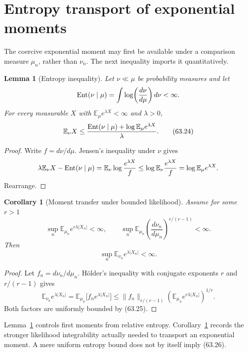 \documentclass[11pt]{article}
\newtheorem{lemma}[theorem]{Lemma}
\newtheorem{corollary}[theorem]{Corollary}
\theoremstyle{remark}
\begin{document}
\section{Entropy transport of exponential moments}

The coercive exponential moment may first be available under a
comparison measure \(\mu_n\), rather than \(\nu_n\).  The next
inequality imports it quantitatively.

\begin{lemma}[Entropy inequality]
\label{lem:v15v63-entropy}
Let \(\nu\ll\mu\) be probability measures and let
\[
 {\rm Ent}(\nu\mid\mu)
 =
 \int\log\!\left(\frac{d\nu}{d\mu}\right)d\nu<\infty.
\]
For every measurable \(X\) with
\(\mathbb E_\mu e^{\lambda X}<\infty\) and \(\lambda>0\),
\[
 \mathbb E_\nu X
 \leq
 \frac{
 {\rm Ent}(\nu\mid\mu)+
 \log\mathbb E_\mu e^{\lambda X}}
 {\lambda}.                                           \tag{63.24}
\]
\end{lemma}

\begin{proof}
Write \(f=d\nu/d\mu\).  Jensen's inequality under \(\nu\) gives
\[
 \lambda\mathbb E_\nu X-{\rm Ent}(\nu\mid\mu)
 =
 \mathbb E_\nu\log\frac{e^{\lambda X}}{f}
 \leq
 \log\mathbb E_\nu\frac{e^{\lambda X}}{f}
 =
 \log\mathbb E_\mu e^{\lambda X}.
\]
Rearrange.
\end{proof}

\begin{corollary}[Moment transfer under bounded likelihood]
\label{cor:v15v63-entropy-transfer}
Assume for some \(r>1\)
\[
 \sup_n\mathbb E_{\mu_n}e^{r\lambda|X_n|}<\infty,
 \qquad
 \sup_n
 \mathbb E_{\mu_n}
 \left(\frac{d\nu_n}{d\mu_n}\right)^{r/(r-1)}
 <\infty.                                             \tag{63.25}
\]
Then
\[
 \sup_n\mathbb E_{\nu_n}e^{\lambda|X_n|}<\infty.       \tag{63.26}
\]
\end{corollary}

\begin{proof}
Let \(f_n=d\nu_n/d\mu_n\).  H\"older's inequality with conjugate
exponents \(r\) and \(r/(r-1)\) gives
\[
 \mathbb E_{\nu_n}e^{\lambda|X_n|}
 =
 \mathbb E_{\mu_n}\bigl[f_ne^{\lambda|X_n|}\bigr]
 \leq
 \|f_n\|_{r/(r-1)}
 \left(\mathbb E_{\mu_n}e^{r\lambda|X_n|}\right)^{1/r}.
\]
Both factors are uniformly bounded by (63.25).
\end{proof}

Lemma~\ref{lem:v15v63-entropy} controls first moments from relative
entropy.  Corollary~\ref{cor:v15v63-entropy-transfer} records the
stronger likelihood integrability actually needed to transport an
exponential moment.  A mere uniform entropy bound does not by
itself imply (63.26).
\end{document}
